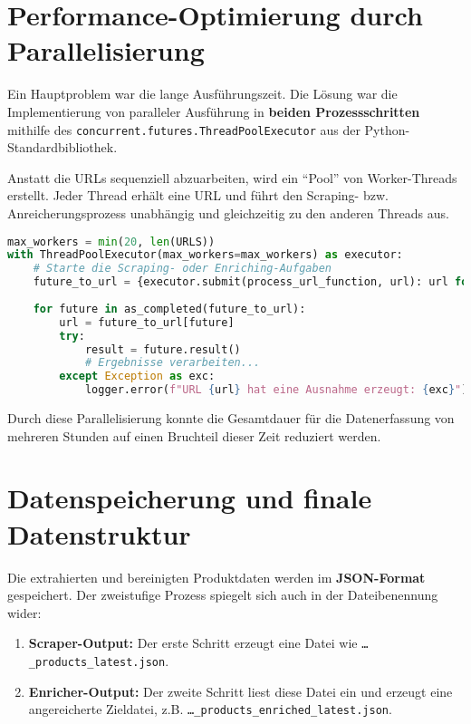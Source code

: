 \documentclass[12pt, a4paper]{report} %
\begin{document}
\section{Performance-Optimierung durch Parallelisierung}
\label{sec:scraping_performance}
Ein Hauptproblem war die lange Ausführungszeit. Die Lösung war die Implementierung von paralleler Ausführung in \textbf{beiden Prozessschritten} mithilfe des \texttt{concurrent.futures.ThreadPoolExecutor} aus der Python-Standardbibliothek.

Anstatt die URLs sequenziell abzuarbeiten, wird ein "`Pool"' von Worker-Threads erstellt. Jeder Thread erhält eine URL und führt den Scraping- bzw. Anreicherungsprozess unabhängig und gleichzeitig zu den anderen Threads aus.

\begin{lstlisting}[language=Python, caption={Parallele Ausführung mit ThreadPoolExecutor}]
max_workers = min(20, len(URLS))
with ThreadPoolExecutor(max_workers=max_workers) as executor:
    # Starte die Scraping- oder Enriching-Aufgaben
    future_to_url = {executor.submit(process_url_function, url): url for url in URLS}
    
    for future in as_completed(future_to_url):
        url = future_to_url[future]
        try:
            result = future.result()
            # Ergebnisse verarbeiten...
        except Exception as exc:
            logger.error(f"URL {url} hat eine Ausnahme erzeugt: {exc}")
\end{lstlisting}
Durch diese Parallelisierung konnte die Gesamtdauer für die Datenerfassung von mehreren Stunden auf einen Bruchteil dieser Zeit reduziert werden.

\section{Datenspeicherung und finale Datenstruktur}
\label{sec:scraping_datenspeicherung}
Die extrahierten und bereinigten Produktdaten werden im \textbf{JSON-Format} gespeichert. Der zweistufige Prozess spiegelt sich auch in der Dateibenennung wider:
\begin{enumerate}
    \item \textbf{Scraper-Output:} Der erste Schritt erzeugt eine Datei wie \texttt{\ldots\_products\_latest.json}.
    \item \textbf{Enricher-Output:} Der zweite Schritt liest diese Datei ein und erzeugt eine angereicherte Zieldatei, z.B. \texttt{\ldots\_products\_enriched\_latest.json}.
\end{enumerate}
\end{document}
